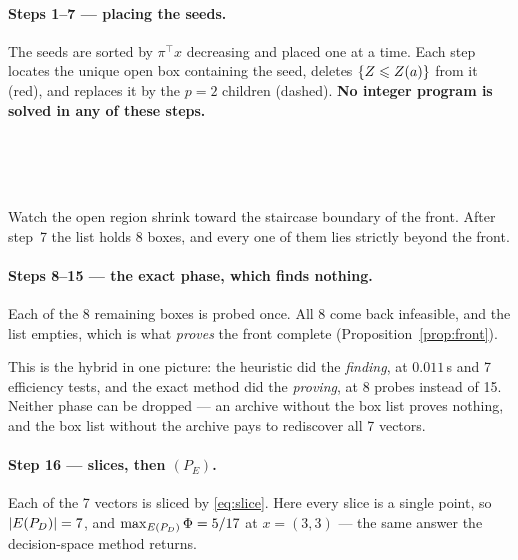 \documentclass[11pt,a4paper]{article}
\begin{document}
\paragraph{Steps 1--7 --- placing the seeds.}  The seeds are sorted by
$\pi^{\top}x$ decreasing and placed one at a time.  Each step locates the
unique open box containing the seed, deletes $\{Z \leqslant Z(a)\}$ from it
(red), and replaces it by the $p = 2$ children (dashed).  \textbf{No integer
program is solved in any of these steps.}

\begin{center}
\quad{}\\[4pt]
\quad{}\\[4pt]
\quad{}\\[4pt]
\end{center}

\noindent
Watch the open region shrink toward the staircase boundary of the front.  After
step~7 the list holds 8 boxes, and every one of them lies strictly beyond the
front.

\paragraph{Steps 8--15 --- the exact phase, which finds nothing.}  Each of the
8 remaining boxes is probed once.  All 8 come back infeasible, and the list
empties, which is what \emph{proves} the front complete
(Proposition~\ref{prop:front}).

\begin{center}\end{center}

\noindent
This is the hybrid in one picture: the heuristic did the \emph{finding}, at
$0.011$\,s and 7 efficiency tests, and the exact method did the \emph{proving},
at 8 probes instead of 15.  Neither phase can be dropped --- an archive without
the box list proves nothing, and the box list without the archive pays to
rediscover all 7 vectors.

\paragraph{Step 16 --- slices, then $(P_E)$.}  Each of the 7 vectors is sliced
by \eqref{eq:slice}.  Here every slice is a single point, so
$|E(P_{D})| = 7$, and $\max_{E(P_{D})} \Phi = 5/17$ at $x = (3,3)$ --- the same answer the
decision-space method returns.
\end{document}
